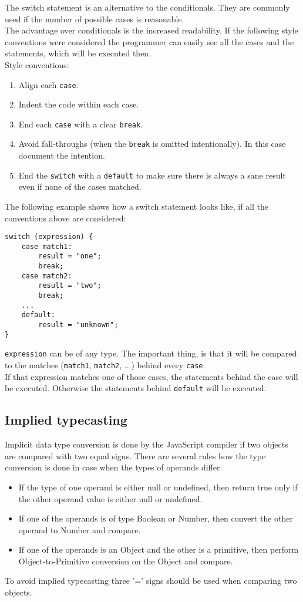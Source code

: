 \documentclass{bioinfo}
\begin{document}
\begin{methods}
The switch statement is an alternative to the conditionals. They are commonly used if the number of possible cases is reasonable.\\
The advantage over conditionals is the increased readability. If the following style conventions were considered the programmer can easily see all the cases and the statements, which will be executed then.\\[0.2cm]
Style conventions:
\begin{enumerate}
\item Align each \texttt{case}.
\item Indent the code within each case.
\item End each \texttt{case} with a clear \texttt{break}.
\item Avoid fall-throughs (when the \texttt{break} is omitted intentionally). In this case document the intention.
\item End the \texttt{switch} with a \texttt{default} to make sure there is always a sane result even if none of the cases matched.
\end{enumerate}
The following example shows how a switch statement looks like, if all the conventions above are considered:
\begin{lstlisting}
switch (expression) {
    case match1:
        result = "one";
        break;
    case match2:
        result = "two";
        break;
    ...
    default:
        result = "unknown";
}
\end{lstlisting}
\texttt{expression} can be of any type. The important thing, is that it will be compared to the matches (\texttt{match1}, \texttt{match2}, ...) behind every \texttt{case}. \\
If that expression matches one of those cases, the statements behind the case will be executed.
Otherwise the statements behind \texttt{default} will be executed.

\subsection{Implied typecasting}
Implicit data type conversion is done by the JavaScript compiler if two objects are compared with two equal signs. There are several rules how the type conversion is done in case when the types of operands differ. 
\begin{itemize}
	\item If the type of one operand is either null or undefined, then return true only if the other operand value is either null or undefined.
	\item If one of the operands is of type Boolean or Number, then convert the other operand to Number and compare.
	\item If one of the operands is an Object and the other is a primitive, then perform Object-to-Primitive conversion on the Object and compare.
\end{itemize}
To avoid implied typecasting three '=' signs should be used when comparing two objects.


\end{methods}
\end{document}

